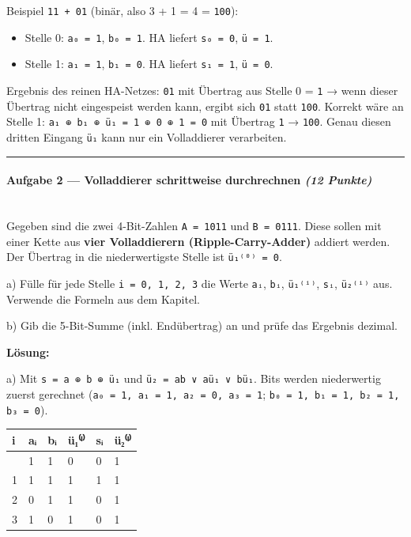 \documentclass[11pt, a4paper]{article}
\begin{document}
Beispiel \texttt{11 + 01} (binär, also 3 + 1 = 4 = \texttt{100}):


\begin{itemize}
  \item Stelle 0: \texttt{a₀ = 1}, \texttt{b₀ = 1}. HA liefert \texttt{s₀ = 0}, \texttt{ü = 1}.
  \item Stelle 1: \texttt{a₁ = 1}, \texttt{b₁ = 0}. HA liefert \texttt{s₁ = 1}, \texttt{ü = 0}.
\end{itemize}

Ergebnis des reinen HA-Netzes: \texttt{01} mit Übertrag aus Stelle 0 = \texttt{1} → wenn dieser Übertrag nicht eingespeist werden kann, ergibt sich \texttt{01} statt \texttt{100}. Korrekt wäre an Stelle 1: \texttt{a₁ ⊕ b₁ ⊕ ü₁ = 1 ⊕ 0 ⊕ 1 = 0} mit Übertrag \texttt{1} → \texttt{100}. Genau diesen dritten Eingang \texttt{ü₁} kann nur ein Volladdierer verarbeiten.



\noindent\textcolor{rulegray}{\rule{\linewidth}{0.4pt}}


\paragraph{Aufgabe 2 — Volladdierer schrittweise durchrechnen \textit{(12 Punkte)}}\mbox{}\\[2pt]

Gegeben sind die zwei 4-Bit-Zahlen \texttt{A = 1011} und \texttt{B = 0111}. Diese sollen mit einer Kette aus \textbf{vier Volladdierern (Ripple-Carry-Adder)} addiert werden. Der Übertrag in die niederwertigste Stelle ist \texttt{ü₁⁽⁰⁾ = 0}.


a) Fülle für jede Stelle \texttt{i = 0, 1, 2, 3} die Werte \texttt{aᵢ}, \texttt{bᵢ}, \texttt{ü₁⁽ⁱ⁾}, \texttt{sᵢ}, \texttt{ü₂⁽ⁱ⁾} aus. Verwende die Formeln aus dem Kapitel.


b) Gib die 5-Bit-Summe (inkl. Endübertrag) an und prüfe das Ergebnis dezimal.


\textbf{Lösung:}


a) Mit \texttt{s = a ⊕ b ⊕ ü₁} und \texttt{ü₂ = ab ∨ aü₁ ∨ bü₁}. Bits werden niederwertig zuerst gerechnet (\texttt{a₀ = 1, a₁ = 1, a₂ = 0, a₃ = 1}; \texttt{b₀ = 1, b₁ = 1, b₂ = 1, b₃ = 0}).



{\small
\begin{tabularx}{\linewidth}{XXXXXX}
\hline
\rowcolor{tableheadbg}
{\color{white}\textbf{i}} & {\color{white}\textbf{aᵢ}} & {\color{white}\textbf{bᵢ}} & {\color{white}\textbf{ü₁⁽ⁱ⁾}} & {\color{white}\textbf{sᵢ}} & {\color{white}\textbf{ü₂⁽ⁱ⁾}} \\[2pt]
\hline
\endhead
\hline
\endfoot
0 & 1 & 1 & 0 & 0 & 1 \\
1 & 1 & 1 & 1 & 1 & 1 \\
2 & 0 & 1 & 1 & 0 & 1 \\
3 & 1 & 0 & 1 & 0 & 1 \\
\end{tabularx}
}
\end{document}
